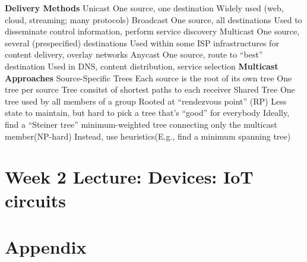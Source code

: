 \documentclass[11 pt]{scrartcl}
\begin{document}
\textbf{Delivery Methods}
\itemnum
    \ii Unicast
    \itemnum
        \ii One source, one destination
        \ii Widely used (web, cloud, streaming; many protocols)
    \itemend
    \ii Broadcast
    \itemnum
        \ii One source, all destinations
        \ii Used to disseminate control information, perform service discovery
    \itemend
    \ii Multicast
    \itemnum
        \ii One source, several (prespecified) destinations
        \ii Used within some ISP infrastructures for content delivery, overlay networks        
    \itemend
    \ii Anycast
    \itemnum
        \ii One source, route to “best” destination
        \ii Used in DNS, content distribution, service selection
    \itemend
\itemend
\textbf{Multicast Approaches}\newline
Source-Specific Trees\newline
\itemnum
    \ii Each source is the root of its own tree
    \ii One tree per source
    \ii Tree consitst of shortest paths to each receiver
\itemend
Shared Tree
\itemnum
    \ii One tree used by all members of a group
    \ii Rooted at “rendezvous point” (RP)
    \ii Less state to maintain, but hard to pick a tree that’s “good” for everybody
    \ii Ideally, find a “Steiner tree” minimum-weighted tree connecting only the multicast member(NP-hard)
    \ii Instead, use heuristics(E.g., find a minimum spanning tree)
\itemend
\newpage
\section{Week 2 Lecture: Devices: IoT circuits}
\section{Appendix}
\renewcommand{\listtheoremname}{List of Definitions and Theorems}
\listoftheorems[ignoreall,show={theorem,definition}]

\listoftodos
\end{document}
